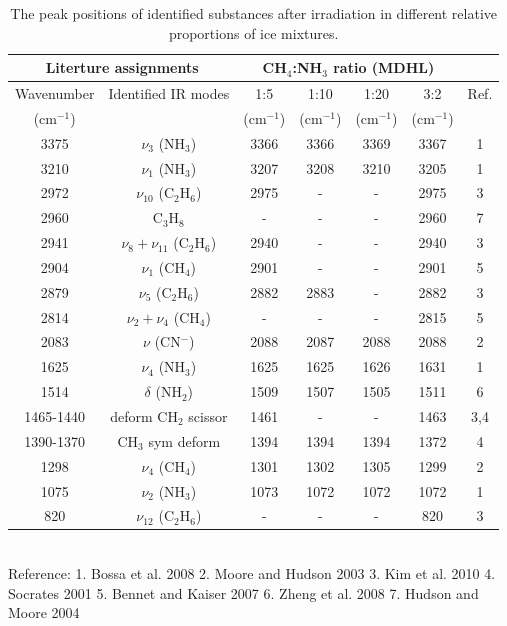 \begin{table}[htbp]
\caption{The peak positions of identified substances after irradiation in different relative proportions of ice mixtures.}
\label{tab:WavenumberMDHL}
\begin{tabular}{ccccccc}
\hline
\hline
\multicolumn{2}{c}{Literture assignments} & \multicolumn{4}{c}{CH$_4$:NH$_3$ ratio (MDHL)} &  \\
\hline
Wavenumber & Identified IR modes & 1:5  & 1:10  & 1:20  & 3:2  & Ref. \\
(cm$^{-1}$) &   & (cm$^{-1}$) & (cm$^{-1}$) & (cm$^{-1}$) & (cm$^{-1}$) &\\
\hline
3375 & $\nu_3$ (NH$_3$) & 3366 & 3366 & 3369 & 3367 & 1 \\
3210 & $\nu_1$ (NH$_3$) & 3207 & 3208 & 3210 & 3205 & 1 \\
2972 & $\nu_{10}$ (C$_2$H$_6$) & 2975 & - & - & 2975 & 3 \\
2960 & C$_3$H$_8$ & - & - & - & 2960 & 7 \\
2941 & $\nu_8+\nu_11$ (C$_2$H$_6$) & 2940 & - & - & 2940 & 3 \\
2904 & $\nu_1$ (CH$_4$) & 2901 & - & - & 2901 & 5 \\
2879 & $\nu_5$ (C$_2$H$_6$) & 2882 & 2883 & - & 2882 & 3 \\
2814 & $\nu_2+\nu_4$ (CH$_4$) & - & - & - & 2815 & 5 \\
2083 & $\nu$ (CN$^-$) & 2088 & 2087 & 2088 & 2088 & 2 \\
1625 & $\nu_4$ (NH$_3$) & 1625 & 1625 & 1626 & 1631 & 1 \\
1514 & $\delta$ (NH$_2$) & 1509 & 1507 & 1505 & 1511 & 6 \\
1465-1440 & deform CH$_2$ scissor & 1461 & - & - & 1463 & 3,4 \\
1390-1370 & CH$_3$ sym deform & 1394 & 1394 & 1394 & 1372 & 4 \\
1298 & $\nu_4$ (CH$_4$) & 1301 & 1302 & 1305 & 1299 & 2 \\
1075 & $\nu_2$ (NH$_3$) & 1073 & 1072 & 1072 & 1072 & 1 \\
820 & $\nu_{12}$ (C$_2$H$_6$) & - & - & - & 820 & 3 \\
\hline
\end{tabular}\\
Reference: 1. Bossa et al. 2008 \cite{bossa2008carbamic} 2. Moore and Hudson 2003 \cite{moore2003infrared} 3. Kim et al. 2010 \cite{kim2010abiotic} 4. Socrates 2001 \cite{socrates2001infrared} 5. Bennet and Kaiser 2007 \cite{bennett2007formation} 6. Zheng et al. 2008 \cite{zheng2008formation} 7. Hudson and Moore 2004 \cite{hudson2004reactions}
\end{table}

